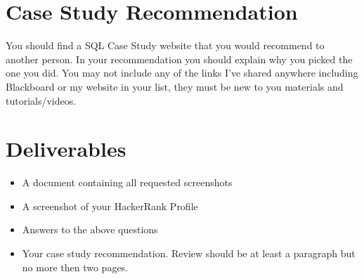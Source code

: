 \documentclass[12pt]{article}
\begin{document}
    \section*{Case Study Recommendation}
You should find a SQL Case Study website that you would recommend to another person.  In your recommendation you should explain why you picked the one you did. 
You may not include any of the links I've shared anywhere including Blackboard or my website in your list, they must be new to you materials and tutorials/videos. 


\section*{Deliverables}
\begin{itemize}
    \item A document containing all requested screenshots
    \item A screenshot of your HackerRank Profile
    \item Answers to the above questions
    \item Your case study recommendation.  Review should be at least a paragraph but no more then two pages. 
\end{itemize} 
\end{document}
